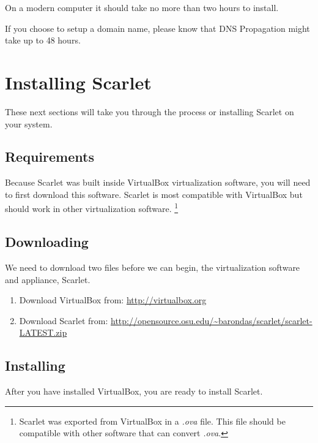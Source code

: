 \documentclass[pdftex,11pt,letterpaper]{article}
\begin{document}
On a modern computer it should take no more than two hours to install.

If you choose to setup a domain name, please know that DNS Propagation might take up to 48 hours.

\section{Installing Scarlet}

These next sections will take you through the process or installing Scarlet on your system.

\subsection{Requirements}

Because Scarlet was built inside VirtualBox virtualization software, you will need to first download this software.  Scarlet is most compatible with VirtualBox but should work in other virtualization software.
\footnote{Scarlet was exported from VirtualBox in a \textit{.ova} file.  This file should be compatible with other software that can convert \textit{.ova}.}

\subsection{Downloading}

We need to download two files before we can begin, the virtualization software and appliance, Scarlet.

\begin{enumerate}
  \item Download VirtualBox from: \url{http://virtualbox.org}
  \item Download Scarlet from: \url{http://opensource.osu.edu/~barondas/scarlet/scarlet-LATEST.zip}
\end{enumerate}

\subsection{Installing}

After you have installed VirtualBox, you are ready to install Scarlet.
\end{document}
